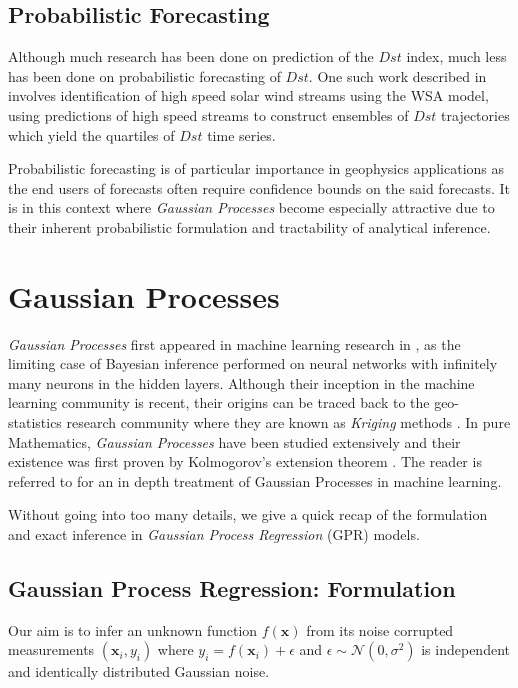 \documentclass{article}
\begin{document}
\subsection{Probabilistic Forecasting}
Although much research has been done on prediction of the $Dst$ index, much less has been done on probabilistic forecasting of $Dst$. One such work described in \citet{McPherron:2013} involves identification of high speed solar wind streams using the WSA model, using predictions of high speed streams to construct ensembles of $Dst$ trajectories which yield the quartiles of $Dst$ time series. 

Probabilistic forecasting is of particular importance in geophysics applications as the end users of forecasts often require confidence bounds on the said forecasts. It is in this context where \emph{Gaussian Processes} become especially attractive due to their inherent probabilistic formulation and tractability of analytical inference.


\section{Gaussian Processes}

\emph{Gaussian Processes} first appeared in machine learning research in \citet{Neal:1996:BLN:525544}, as the limiting case of Bayesian inference performed on neural networks with infinitely many neurons in the hidden layers. Although their inception in the machine learning community is recent, their origins can be traced back to the geo-statistics research community where they are known as \emph{Kriging} methods \citep{krige1951statistical}. In pure Mathematics, \emph{Gaussian Processes} have been studied extensively and their existence was first proven by Kolmogorov's extension theorem \citep{tao2011introduction}. The reader is referred to \citet{Rasmussen:2005:GPM:1162254} for an in depth treatment of Gaussian Processes in machine learning.

Without going into too many details, we give a quick recap of the formulation and exact inference in \emph{Gaussian Process Regression} (GPR) models. 

\subsection{Gaussian Process Regression: Formulation}

Our aim is to infer an unknown function $f(\mathbf{x})$ from its noise corrupted measurements $(\mathbf{x}_i, y_i)$ where $y_i = f(\mathbf{x}_i) + \epsilon$ and $\epsilon \sim \mathcal{N}(0, \sigma^2)$ is independent and identically distributed Gaussian noise.
\end{document}
